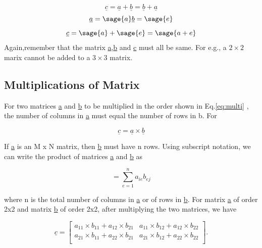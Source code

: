 \documentclass[12pt]{report}
\newcommand{\lab}[1]{
	Eq.\ref{#1}
}
\begin{document}
\begin{equation}
	\underline{c}=\underline{a}+
	\underline{b}= \underline{b}+\underline{a} 
\end{equation}
	$$\underline{a}=\sage{a}
	\underline{b}=\sage{e}$$
	$$\underline{c}=\sage{a} + \sage{e}=\sage{a+e}$$
Again,remember that the matrix 
\underline{a},\underline{b} and \underline{c} must 
all be same. For e.g., a $ 2 \times 2 $ 
marix cannot be added to a $ 3 \times 3 $ matrix.


\subsection{Multiplications of Matrix}

For two matrices \underline{a} and \underline{b}
to be multiplied in the order shown in \lab{eq:multi},
the number of columns in \underline{a} must equal the
number of rows in b. For

\begin{equation}
	\underline{c} = \underline{a} \times \underline{b}	
	\label{eq:multi}
\end{equation}

If \underline{a} is an M x N matrix,
then \underline{b} must have n
rows. Using subscript notation, 
we can write the product of matrices
\underline{a} and \underline{b} as

\begin{equation}
	[c_{{ij}}] = \sum_{e=1}^{n} {a_{ie}}{b_{ej}}
\end  {equation}

where n is the total number of columns in \underline{a} or of rows in
\underline{b}. For matrix \underline{a} of order 2x2 and matrix
\underline{b} of order 2x2, after multiplying the two matrices, we
have

\begin{equation}
	\underline{c}=\left[\begin{array}{rrrrrr}
	a_{11} \times b_{11} + a_{12} \times b_{21} & a_{11} \times b_{12} + a_{12} \times b_{22}\\
	a_{21} \times b_{11} + a_{22} \times b_{21} & a_{21} \times b_{12} + a_{22} \times b_{22}\\
\end{array}\right].
\end{equation}
\end{document}
